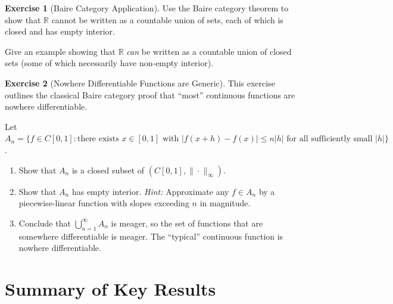 \documentclass[11pt,a4paper]{article}
\theoremstyle{definition}
\newtheorem{exercise}{Exercise}[section]
\theoremstyle{plain}
\theoremstyle{remark}
\newcommand{\R}{\mathbb{R}}
\begin{document}
\begin{exercise}[Baire Category Application]
\label{ex:baire_app}
Use the Baire category theorem to show that $\R$ cannot be written as a countable
union of sets, each of which is closed and has empty interior.

\noindent Give an example showing that $\R$ \emph{can} be written as a countable
union of closed sets (some of which necessarily have non-empty interior).
\end{exercise}

\begin{exercise}[Nowhere Differentiable Functions are Generic]
\label{ex:nowhere_diff}
This exercise outlines the classical Baire category proof that ``most'' continuous
functions are nowhere differentiable.

Let $A_n = \{f \in C[0,1] : \text{there exists } x \in [0,1] \text{ with }
|f(x+h) - f(x)| \le n|h| \text{ for all sufficiently small } |h|\}$.
\begin{enumerate}[nosep,label=(\alph*)]
    \item Show that $A_n$ is a closed subset of $(C[0,1], \|\cdot\|_\infty)$.
    \item Show that $A_n$ has empty interior.
    \textit{Hint:} Approximate any $f \in A_n$ by a piecewise-linear function with
    slopes exceeding $n$ in magnitude.
    \item Conclude that $\bigcup_{n=1}^\infty A_n$ is meager, so the set of
    functions that are somewhere differentiable is meager. The ``typical''
    continuous function is nowhere differentiable.
\end{enumerate}
\end{exercise}

\section{Summary of Key Results}
\label{sec:summary}
\end{document}
